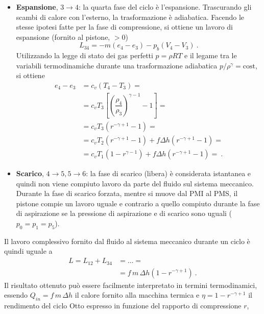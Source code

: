 \begin{itemize}
\item \textbf{Espansione}, $3 \rightarrow 4$: la quarta fase del ciclo è l'espansione. Trascurando gli scambi di calore con l'esterno, la trasformazione è adiabatica. Facendo le stesse ipotesi fatte per la fase di compressione, si ottiene un lavoro di espansione (fornito al pistone, $>0$)
\begin{equation}
 L_{34} = -m (e_4-e_3) - p_b ( V_4 - V_3 ) \ .
\end{equation}
Utilizzando la legge di stato dei gas perfetti $p = \rho R T$ e il legame tra le variabili termodinamiche durante una trasformazione adiabatica $p/\rho^\gamma = \text{cost}$, si ottiene
\begin{equation}
\begin{aligned}
 e_4 - e_3 & = c_v ( T_4 - T_3 ) = \\
  & = c_v T_3 \left[ \left( \dfrac{\rho_4}{\rho_3} \right)^{\gamma-1} - 1 \right] = \\
  & = c_v T_3 \left( r^{-\gamma+1} - 1\right) = \\
  & = c_v T_2 \left( r^{-\gamma+1} - 1\right) +
   f \Delta h \left( r^{-\gamma+1} - 1\right)  = \\ 
  & = c_v T_1 \left( 1 - r^{ \gamma-1}\right) +
   f \Delta h \left( r^{-\gamma+1} - 1\right)  = \ .
\end{aligned}
\end{equation}

\item \textbf{Scarico}, $4 \rightarrow 5, 5 \rightarrow 6$: la fase di scarico (libera) è considerata istantanea e quindi non viene compiuto lavoro da parte del fluido sul sistema meccanico. Durante la fase di scarico forzata, mentre si muove dal PMI al PMS, il pistone compie un lavoro uguale e contrario a quello compiuto durante la fase di aspirazione se la pressione di aspirazione e di scarico sono uguali ($p_0 = p_1 = p_5$).

\end{itemize} \vspace{0.2cm}
%
\noindent
Il lavoro complessivo fornito dal fluido al sistema meccanico durante un ciclo è quindi uguale a 
\begin{equation}
\begin{aligned}
 L = L_{12} + L_{34} & = \dots = \\
 & = f \, m \, \Delta h \left( 1 - r^{-\gamma+1}\right)  \ .
\end{aligned}
\end{equation}
Il risultato ottenuto può essere facilmente interpretato in termini termodinamici, essendo $Q_{in} = f \, m \, \Delta h$ il calore fornito alla macchina termica e $\eta = 1 - r^{-\gamma+1}$ il rendimento del ciclo Otto espresso in funzione del rapporto di compressione $r$,
